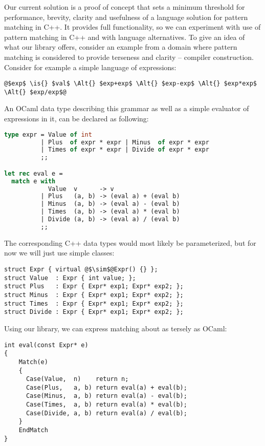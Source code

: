 Our current solution is a proof of concept that sets a minimum threshold for 
performance, brevity, clarity and usefulness of a language solution for pattern 
matching in C++. It provides full functionality, so we can experiment with use 
of pattern matching in C++ and with language alternatives. To give an idea of 
what our library offers, consider an example from a domain where pattern matching 
is considered to provide terseness and clarity -- compiler construction. 
Consider for example a simple language of expressions:

\begin{lstlisting}
@$exp$ \is{} $val$ \Alt{} $exp+exp$ \Alt{} $exp-exp$ \Alt{} $exp*exp$ \Alt{} $exp/exp$@
\end{lstlisting}

\noindent
An OCaml data type describing this grammar as well as a simple evaluator of expressions 
in it, can be declared as following:

\begin{lstlisting}[language=Caml,keepspaces,columns=flexible]
type expr = Value of int 
          | Plus  of expr * expr | Minus  of expr * expr 
          | Times of expr * expr | Divide of expr * expr
          ;;

let rec eval e =
  match e with
            Value  v      -> v
          | Plus   (a, b) -> (eval a) + (eval b)
          | Minus  (a, b) -> (eval a) - (eval b)
          | Times  (a, b) -> (eval a) * (eval b)
          | Divide (a, b) -> (eval a) / (eval b)
          ;;
\end{lstlisting}

\noindent
The corresponding C++ data types would most likely be parameterized, but for
now we will just use simple classes:

\begin{lstlisting}[keepspaces,columns=flexible]
struct Expr { virtual @$\sim$@Expr() {} };
struct Value  : Expr { int value; };
struct Plus   : Expr { Expr* exp1; Expr* exp2; };
struct Minus  : Expr { Expr* exp1; Expr* exp2; };
struct Times  : Expr { Expr* exp1; Expr* exp2; };
struct Divide : Expr { Expr* exp1; Expr* exp2; };
\end{lstlisting}

\noindent
Using our library, we can express matching about as tersely as OCaml:

\begin{lstlisting}[keepspaces,columns=flexible]
int eval(const Expr* e)
{
    Match(e)
    {
      Case(Value,  n)    return n;
      Case(Plus,   a, b) return eval(a) + eval(b);
      Case(Minus,  a, b) return eval(a) - eval(b);
      Case(Times,  a, b) return eval(a) * eval(b);
      Case(Divide, a, b) return eval(a) / eval(b);
    }
    EndMatch
}
\end{lstlisting}

